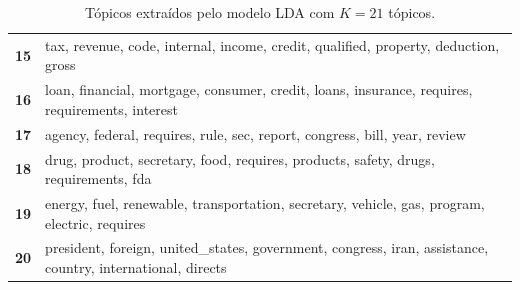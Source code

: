 \begin{table}[htpb]
\begin{tabularx}{\textwidth}{@{}l X@{}}
        \textbf{15} & tax, revenue, code, internal, income, credit, qualified, property, deduction, gross \\
        \textbf{16} & loan, financial, mortgage, consumer, credit, loans, insurance, requires, requirements, interest \\
        \textbf{17} & agency, federal, requires, rule, sec, report, congress, bill, year, review \\
        \textbf{18} & drug, product, secretary, food, requires, products, safety, drugs, requirements, fda \\
        \textbf{19} & energy, fuel, renewable, transportation, secretary, vehicle, gas, program, electric, requires \\
        \textbf{20} & president, foreign, united\_states, government, congress, iran, assistance, country, international, directs \\
        \bottomrule
    \end{tabularx}
    \caption{Tópicos extraídos pelo modelo LDA com $K=21$ tópicos.}
    \label{tab:topicos_lda_21}
\end{table}
